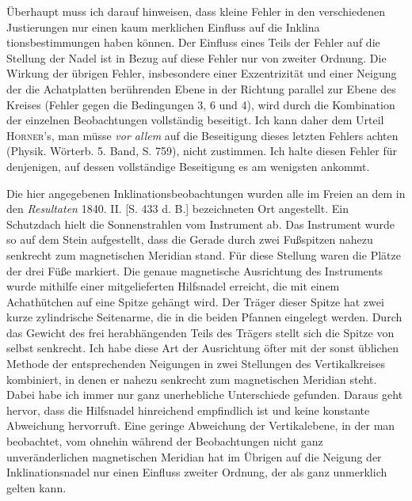 Überhaupt muss ich darauf hinweisen, dass kleine Fehler in den verschiedenen Justierungen nur einen kaum merklichen Einfluss auf die Inklina%
%
tionsbestimmungen haben können. Der Einfluss eines Teils der Fehler auf die Stellung der Nadel ist in Bezug auf diese Fehler nur von zweiter Ordnung. Die Wirkung der übrigen Fehler, insbesondere einer Exzentrizität und einer Neigung der die Achatplatten berührenden Ebene in der Richtung parallel zur Ebene des Kreises (Fehler gegen die Bedingungen 3, 6 und 4), wird durch die Kombination der einzelnen Beobachtungen vollständig beseitigt. Ich kann daher dem Urteil \textsc{Horner}'s, man müsse \textit{vor allem} auf die Beseitigung dieses letzten Fehlers achten (Physik. Wörterb. 5. Band, S. 759), nicht zustimmen. Ich halte diesen Fehler für denjenigen, auf dessen vollständige Beseitigung es am wenigsten ankommt.

Die hier angegebenen Inklinationsbeobachtungen wurden alle im Freien an dem in den \textit{Resultaten} 1840. II. [S. 433 d. B.] bezeichneten Ort angestellt. Ein Schutzdach hielt die Sonnenstrahlen vom Instrument ab. Das Instrument wurde so auf dem Stein aufgestellt, dass die Gerade durch zwei Fußspitzen nahezu senkrecht zum magnetischen Meridian stand. Für diese Stellung waren die Plätze der drei Füße markiert. Die genaue magnetische Ausrichtung des Instruments wurde mithilfe einer mitgelieferten Hilfsnadel erreicht, die mit einem Achathütchen auf eine Spitze gehängt wird. Der Träger dieser Spitze hat zwei kurze zylindrische Seitenarme, die in die beiden Pfannen eingelegt werden. Durch das Gewicht des frei herabhängenden Teils des Trägers stellt sich die Spitze von selbst senkrecht. Ich habe diese Art der Ausrichtung öfter mit der sonst üblichen Methode der entsprechenden Neigungen in zwei Stellungen des Vertikalkreises kombiniert, in denen er nahezu senkrecht zum magnetischen Meridian steht. Dabei habe ich immer nur ganz unerhebliche Unterschiede gefunden. Daraus geht hervor, dass die Hilfsnadel hinreichend empfindlich ist und keine konstante Abweichung hervorruft. Eine geringe Abweichung der Vertikalebene, in der man beobachtet, vom ohnehin während der Beobachtungen nicht ganz unveränderlichen magnetischen Meridian hat im Übrigen auf die Neigung der Inklinationsnadel nur einen Einfluss zweiter Ordnung, der als ganz unmerklich gelten kann.


